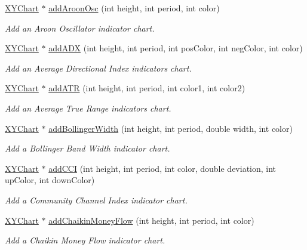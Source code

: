 \begin{DoxyCompactItemize}
\hyperlink{class_x_y_chart}{X\+Y\+Chart} $\ast$ \hyperlink{class_finance_chart_a259aa83c1222608df3f6d95410a97ea4}{add\+Aroon\+Osc} (int height, int period, int color)
\begin{DoxyCompactList}\small\item\em Add an Aroon Oscillator indicator chart. \end{DoxyCompactList}\item 
\hyperlink{class_x_y_chart}{X\+Y\+Chart} $\ast$ \hyperlink{class_finance_chart_ad160627b8abe9c8c14175c93e4e54113}{add\+A\+DX} (int height, int period, int pos\+Color, int neg\+Color, int color)
\begin{DoxyCompactList}\small\item\em Add an Average Directional Index indicators chart. \end{DoxyCompactList}\item 
\hyperlink{class_x_y_chart}{X\+Y\+Chart} $\ast$ \hyperlink{class_finance_chart_a0eaad6d3d543f42315791022bde7bbb3}{add\+A\+TR} (int height, int period, int color1, int color2)
\begin{DoxyCompactList}\small\item\em Add an Average True Range indicators chart. \end{DoxyCompactList}\item 
\hyperlink{class_x_y_chart}{X\+Y\+Chart} $\ast$ \hyperlink{class_finance_chart_abb8be388a034086215ef7c53409469b0}{add\+Bollinger\+Width} (int height, int period, double width, int color)
\begin{DoxyCompactList}\small\item\em Add a Bollinger Band Width indicator chart. \end{DoxyCompactList}\item 
\hyperlink{class_x_y_chart}{X\+Y\+Chart} $\ast$ \hyperlink{class_finance_chart_a1841d99b6f71cafd6207f18a57d5b5d7}{add\+C\+CI} (int height, int period, int color, double deviation, int up\+Color, int down\+Color)
\begin{DoxyCompactList}\small\item\em Add a Community Channel Index indicator chart. \end{DoxyCompactList}\item 
\hyperlink{class_x_y_chart}{X\+Y\+Chart} $\ast$ \hyperlink{class_finance_chart_a1f09c095f7013a3e8d9e6d97009e1d26}{add\+Chaikin\+Money\+Flow} (int height, int period, int color)
\begin{DoxyCompactList}\small\item\em Add a Chaikin Money Flow indicator chart. \end{DoxyCompactList}\item 

\end{DoxyCompactItemize}
